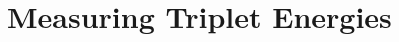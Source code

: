 \documentclass[../thesis.tex]{subfiles}
\begin{document}
\section{Measuring Triplet Energies}




\end{document}
